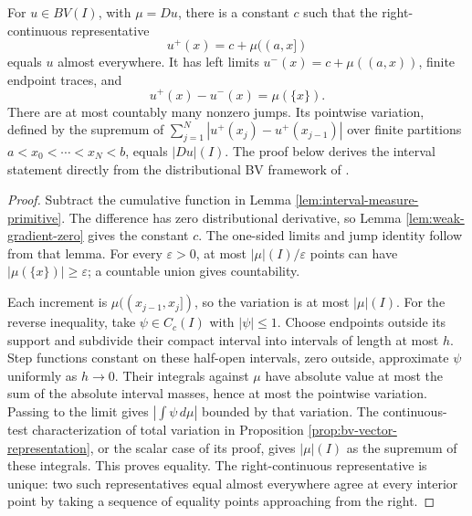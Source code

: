 \begin{theorem}\label{thm:interval-bv-representative}
For $u\in BV(I)$, with $\mu=Du$, there is a constant $c$ such that the right-continuous representative
\[
 u^+(x)=c+\mu((a,x])
\]
equals $u$ almost everywhere. It has left limits $u^-(x)=c+\mu((a,x))$, finite endpoint traces, and
\[
 u^+(x)-u^-(x)=\mu(\{x\}).
\]
There are at most countably many nonzero jumps. Its pointwise variation, defined by the supremum of $\sum_{j=1}^N|u^+(x_j)-u^+(x_{j-1})|$ over finite partitions $a<x_0<\cdots<x_N<b$, equals $|Du|(I)$.
The proof below derives the interval statement directly from the distributional BV framework of \cite{Sim18}.
\end{theorem}
\begin{proof}
Subtract the cumulative function in Lemma \ref{lem:interval-measure-primitive}. The difference has zero distributional derivative, so Lemma \ref{lem:weak-gradient-zero} gives the constant $c$. The one-sided limits and jump identity follow from that lemma. For every $\varepsilon>0$, at most $|\mu|(I)/\varepsilon$ points can have $|\mu(\{x\})|\geq\varepsilon$; a countable union gives countability.

Each increment is $\mu((x_{j-1},x_j])$, so the variation is at most $|\mu|(I)$. For the reverse inequality, take $\psi\in C_c(I)$ with $|\psi|\leq1$. Choose endpoints outside its support and subdivide their compact interval into intervals of length at most $h$. Step functions constant on these half-open intervals, zero outside, approximate $\psi$ uniformly as $h\to0$. Their integrals against $\mu$ have absolute value at most the sum of the absolute interval masses, hence at most the pointwise variation. Passing to the limit gives $|\int\psi\,d\mu|$ bounded by that variation. The continuous-test characterization of total variation in Proposition \ref{prop:bv-vector-representation}, or the scalar case of its proof, gives $|\mu|(I)$ as the supremum of these integrals. This proves equality. The right-continuous representative is unique: two such representatives equal almost everywhere agree at every interior point by taking a sequence of equality points approaching from the right.
\end{proof}

